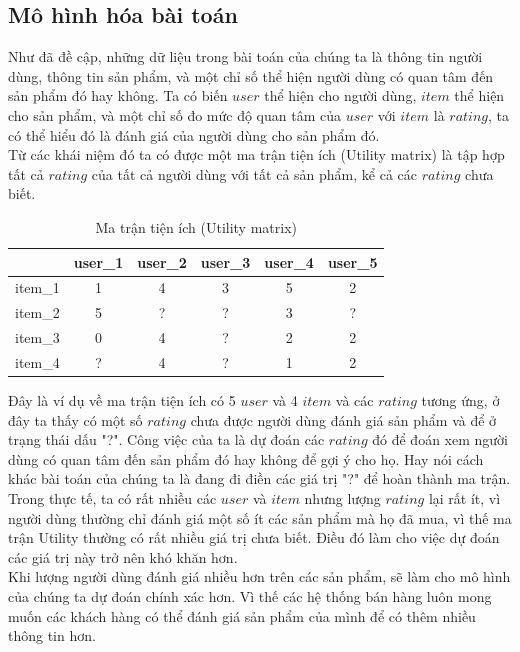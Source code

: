 \subsection{Mô hình hóa bài toán}
Như đã đề cập, những dữ liệu trong bài toán của chúng ta là thông tin người dùng, thông tin sản phẩm, và một chỉ số thể hiện người dùng có quan tâm đến sản phẩm đó hay không. Ta có biến $user$ thể hiện cho người dùng, $item$ thể hiện cho sản phẩm, và một chỉ số đo mức độ quan tâm của $user$ với $item$ là $rating$, ta có thể hiểu đó là đánh giá của người dùng cho sản phẩm đó.\\
Từ các khái niệm đó ta có được một ma trận tiện ích (Utility matrix) là tập hợp tất cả $rating$ của tất cả người dùng với tất cả sản phẩm, kể cả các $rating$ chưa biết.
\begin{table}[H]
\centering
    \begin{tabular}{|c|c|c|c|c|c|}
\hline
     &user\_1 & user\_2& user\_3& user\_4& user\_5  \\ \hline
     item\_1& 1& 4& 3 & 5& 2 \\ \hline
     item\_2& 5& ?& ? & 3& ? \\ \hline
     item\_3& 0& 4& ? & 2& 2 \\ \hline
     item\_4& ?& 4& ? & 1& 2 \\ \hline
\end{tabular}
\caption{Ma trận tiện ích (Utility matrix)}
\end{table}
Đây là ví dụ về ma trận tiện ích có 5 $user$ và 4 $item$ và các $rating$ tương ứng, ở đây ta thấy có một số $rating$ chưa được người dùng đánh giá sản phẩm và để ở trạng thái dấu "?". Công việc của ta là dự đoán các $rating$ đó để đoán xem người dùng có quan tâm đến sản phẩm đó hay không để gợi ý cho họ. Hay nói cách khác bài toán của chúng ta là đang đi điền các giá trị "?" để hoàn thành ma trận.\\
Trong thực tế, ta có rất nhiều các $user$ và $item$ nhưng lượng $rating$ lại rất ít, vì người dùng thường chỉ đánh giá một số ít các sản phẩm mà họ đã mua, vì thế ma trận Utility thường có rất nhiều giá trị chưa biết. Điều đó làm cho việc dự đoán các giá trị này trở nên khó khăn hơn.\\
Khi lượng người dùng đánh giá nhiều hơn trên các sản phẩm, sẽ làm cho mô hình của chúng ta dự đoán chính xác hơn. Vì thế các hệ thống bán hàng luôn mong muốn các khách hàng có thể đánh giá sản phẩm của mình để có thêm nhiều thông tin hơn.
